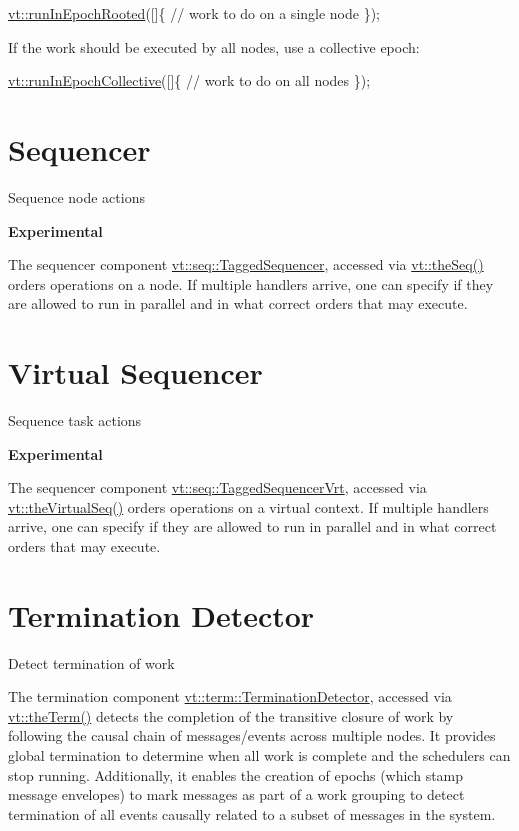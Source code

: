 \begin{DoxyCode}
\hyperlink{namespacevt_a9f5cbbc484d7f14f2ad0ee46d62dfb6e}{vt::runInEpochRooted}([]\{
  \textcolor{comment}{// work to do on a single node}
\});
\end{DoxyCode}


If the work should be executed by all nodes, use a collective epoch\+:


\begin{DoxyCode}
\hyperlink{namespacevt_a2fc4ef34f30b49a1781d765804bfadbb}{vt::runInEpochCollective}([]\{
  \textcolor{comment}{// work to do on all nodes}
\});
\end{DoxyCode}
 \hypertarget{seq}{}\section{Sequencer}\label{seq}
Sequence node actions

 {\bfseries Experimental}

The sequencer component {\ttfamily \hyperlink{structvt_1_1seq_1_1_tagged_sequencer}{vt\+::seq\+::\+Tagged\+Sequencer}}, accessed via {\ttfamily \hyperlink{namespacevt_a4a7d07c845b311da59286de486d623c7}{vt\+::the\+Seq()}} orders operations on a node. If multiple handlers arrive, one can specify if they are allowed to run in parallel and in what correct orders that may execute. \hypertarget{vrtseq}{}\section{Virtual Sequencer}\label{vrtseq}
Sequence task actions

 {\bfseries Experimental}

The sequencer component {\ttfamily \hyperlink{structvt_1_1seq_1_1_tagged_sequencer_vrt}{vt\+::seq\+::\+Tagged\+Sequencer\+Vrt}}, accessed via {\ttfamily \hyperlink{namespacevt_abdbb9ddb0d79b35c89e9d742d3fc9d42}{vt\+::the\+Virtual\+Seq()}} orders operations on a virtual context. If multiple handlers arrive, one can specify if they are allowed to run in parallel and in what correct orders that may execute. \hypertarget{term}{}\section{Termination Detector}\label{term}
Detect termination of work

The termination component {\ttfamily \hyperlink{structvt_1_1term_1_1_termination_detector}{vt\+::term\+::\+Termination\+Detector}}, accessed via {\ttfamily \hyperlink{namespacevt_a127580fdfcaba0b4171e5c48c5676733}{vt\+::the\+Term()}} detects the completion of the transitive closure of work by following the causal chain of messages/events across multiple nodes. It provides global termination to determine when all work is complete and the schedulers can stop running. Additionally, it enables the creation of epochs (which stamp message envelopes) to mark messages as part of a work grouping to detect termination of all events causally related to a subset of messages in the system.

